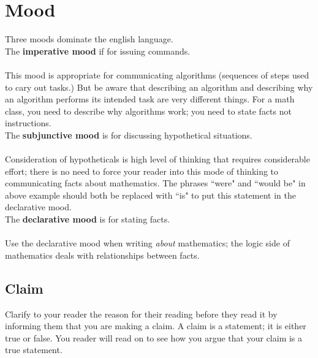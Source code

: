 \documentclass[12pt]{article}
\def\noi{\noindent}
\def\thup{\rightthumbsup}
\def\thdn{\rightthumbsdown}
\begin{document}
\section{ Mood}
Three moods dominate the english language. \\

\noi The {\bfseries imperative mood} if for issuing commands.\\[.2cm]
\thdn \\
This mood is appropriate for communicating  algorithms (sequences of steps used to cary out tasks.) But be aware that  describing an algorithm and describing why an algorithm performs its intended task are very different things. For a math class, you need to describe why algorithms work; you need to state facts not instructions.\\


\noi The {\bfseries subjunctive mood} is for discussing hypothetical situations.\\[.2cm]
\thdn \\[.2cm]
Consideration of hypotheticals  is high level of thinking that requires considerable effort; there is no need to force your reader into this mode of thinking to communicating facts about mathematics.  
The phrases ``were" and ``would be" in above example should both be replaced with ``is" to put this statement in the declarative mood.\\

\noi The {\bfseries declarative mood} is for stating facts.\\[.2cm]
 \thup\\

Use the declarative mood when writing {\it about} mathematics; the logic side of mathematics deals with relationships between facts.





\subsection{Claim}
Clarify to your reader the reason for their reading before they read it by informing them that you are making a claim. %
A claim is a statement; it is either true or false. 
You reader will read on to see how you argue that your claim is a true statement. 
\end{document}

